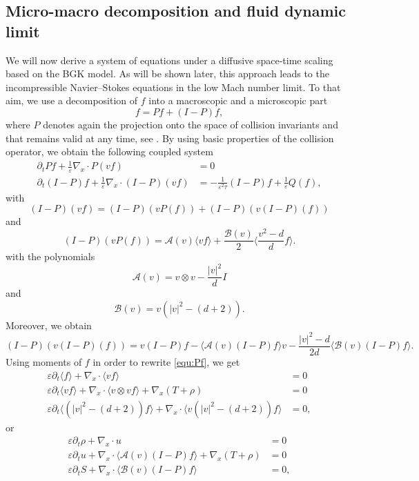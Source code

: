 \documentclass[final,11pt]{siamart251216}
\numberwithin{equation}{section}
\theoremstyle{definition}
\theoremstyle{remark}
\begin{document}
\subsection{Micro-macro decomposition and fluid dynamic limit}\label{sec2.1}
We will now derive a system of equations under a diffusive space-time scaling based on the BGK model. As will be shown later, this approach leads to the incompressible Navier--Stokes equations in the low Mach number limit. 
To that aim, we use a decomposition of $f$ into a macroscopic and a microscopic part 
\[
f = Pf + (I-P)f,
\]
where $P$ denotes again the projection onto the space of collision invariants and that remains valid at any time, see \cite{LemouMieussens}. By using basic properties of the collision operator, we obtain the following coupled system
\begin{align}
\partial_t Pf + \frac{1}{\varepsilon} \nabla_x \cdot P(vf) &= 0 \label{equ:Pf}\\
\partial_t (I-P)f + \frac{1}{\varepsilon} \nabla_x \cdot (I-P)(vf) &= - \frac{1}{\varepsilon^2 \tau} (I-P)f + \frac{1}{\varepsilon} Q(f),\label{equ:I-Pf}
\end{align}
with 
\[
(I-P)(vf) = (I-P)(vP(f)) + (I-P)(v(I-P)(f))
\]
and 
\[
(I-P)(vP(f)) = \mathcal{A}(v) \langle vf \rangle + \frac{\mathcal{B}(v)}{2} \langle \frac{v^2 - d}{d} f\rangle.
\]
with the polynomials 
$$
\mathcal{A}(v) = v \otimes v -\frac{\vert v \vert^2 }{d}I
$$
and 
$$
\mathcal{B}(v) = v (\vert v \vert^2 -(d+2)).
$$
Moreover, we obtain
\[
(I-P)(v(I-P)(f)) = v(I-P)f - \langle \mathcal{A}(v) (I-P)f \rangle v - \frac{|v|^2 - d}{2d} \langle\mathcal{B}(v)(I-P)f\rangle.
\]
Using moments of $f$ in order to rewrite \eqref{equ:Pf}, we get
\begin{align}
\varepsilon \partial_t \langle f \rangle +  \nabla_x \cdot \langle v f \rangle &= 0 \nonumber \\
\varepsilon \partial_t \langle v f \rangle + \nabla_x \cdot \langle v \otimes v f \rangle +  \nabla_x (T+\rho) &= 0  \\
\varepsilon \partial_t \langle (|v|^2 - (d+2))f \rangle +  \nabla_x \cdot \langle v(|v|^2 - (d+2))f \rangle &= 0, \nonumber
\end{align}
or
\begin{align}
\varepsilon \partial_t \rho +  \nabla_x \cdot u &= 0 \nonumber \\
\varepsilon \partial_t u + \nabla_x \cdot \langle \mathcal{A}(v) (I-P)f \rangle +  \nabla_x (T+\rho) &= 0 \label{eq:moments} \\
\varepsilon \partial_t S +  \nabla_x \cdot \langle \mathcal{B}(v) (I-P)f \rangle &= 0, \nonumber
\end{align}
\end{document}
